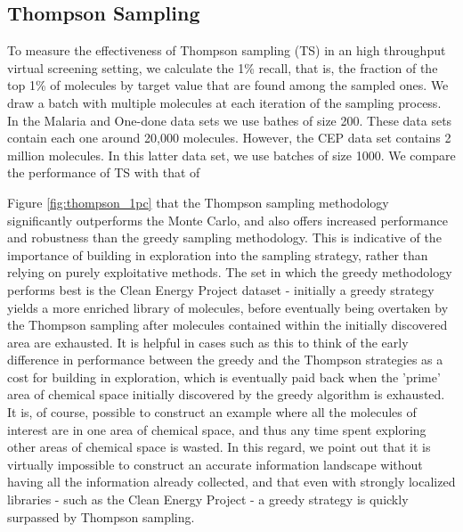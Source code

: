 \subsection{Thompson Sampling}

To measure the effectiveness of Thompson sampling (TS) in an high throughput virtual screening setting, we calculate the 1\% recall, that is, the fraction of the top 1\% of molecules by target value that are found among the sampled ones. We draw a batch with multiple molecules at each iteration of the sampling process. In the Malaria and One-done data sets we use bathes of size 200. These data sets contain each one around 20,000 molecules. However, the CEP data set contains 2 million molecules. In this latter data set, we use batches of size 1000. We compare the performance of TS with that of 

Figure \ref{fig:thompson_1pc} that the Thompson sampling methodology significantly outperforms the Monte Carlo, and also offers increased performance and robustness than the greedy sampling methodology.  This is indicative of the importance of building in exploration into the sampling strategy, rather than relying on purely exploitative methods.  The set in which the greedy methodology performs best is the Clean Energy Project dataset - initially a greedy strategy yields a more enriched library of molecules, before eventually being overtaken by the Thompson sampling after molecules contained within the initially discovered area are exhausted.  It is helpful in cases such as this to think of the early difference in performance between the greedy and the Thompson strategies as a cost for building in exploration, which is eventually paid back when the 'prime' area of chemical space initially discovered by the greedy algorithm is exhausted.  It is, of course, possible to construct an example where all the molecules of interest are in one area of chemical space, and thus any time spent exploring other areas of chemical space is wasted.  In this regard, we point out that it is virtually impossible to construct an accurate information landscape without having all the information already collected, and that even with strongly localized libraries - such as the Clean Energy Project - a greedy strategy is quickly surpassed by Thompson sampling. 
  
